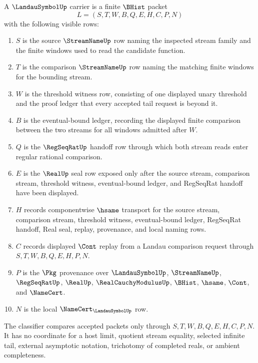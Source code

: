 \begin{definition}
\label{def:landau-symbol-carrier}
A $\LandauSymbolUp$ carrier is a finite $\BHist$ packet
$$
L=(S,T,W,B,Q,E,H,C,P,N)
$$
with the following visible rows:
\begin{enumerate}
\item $S$ is the source $\StreamNameUp$ row naming the inspected stream family and the finite windows used to read the candidate function.
\item $T$ is the comparison $\StreamNameUp$ row naming the matching finite windows for the bounding stream.
\item $W$ is the threshold witness row, consisting of one displayed unary threshold and the proof ledger that every accepted tail request is beyond it.
\item $B$ is the eventual-bound ledger, recording the displayed finite comparison between the two streams for all windows admitted after $W$.
\item $Q$ is the $\RegSeqRatUp$ handoff row through which both stream reads enter regular rational comparison.
\item $E$ is the $\RealUp$ seal row exposed only after the source stream, comparison stream, threshold witness, eventual-bound ledger, and RegSeqRat handoff have been displayed.
\item $H$ records componentwise $\hsame$ transport for the source stream, comparison stream, threshold witness, eventual-bound ledger, RegSeqRat handoff, Real seal, replay, provenance, and local naming rows.
\item $C$ records displayed $\Cont$ replay from a Landau comparison request through $S,T,W,B,Q,E,H,P,N$.
\item $P$ is the $\Pkg$ provenance over $\LandauSymbolUp$, $\StreamNameUp$, $\RegSeqRatUp$, $\RealUp$, $\RealCauchyModulusUp$, $\BHist$, $\hsame$, $\Cont$, and $\NameCert$.
\item $N$ is the local $\NameCert_{\LandauSymbolUp}$ row.
\end{enumerate}
The classifier compares accepted packets only through $S,T,W,B,Q,E,H,C,P,N$. It has no coordinate for a host limit, quotient stream equality, selected infinite tail, external asymptotic notation, trichotomy of completed reals, or ambient completeness.
\end{definition}

